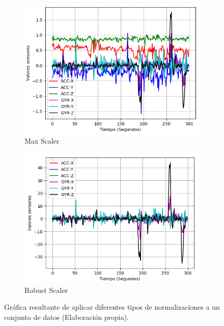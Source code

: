 \begin{figure}
{\begin{varwidth}{\textwidth}
        \begin{subfigure}[h]{0.45\textwidth} 
            \includegraphics[width=\textwidth]{imagenes/Cap3/datos_max_scaler}
            \caption{Max Scaler}
            \label{fig:max}
        \end{subfigure}       
        \begin{subfigure}[h]{0.45\textwidth} 
            \includegraphics[width=\textwidth]{imagenes/Cap3/datos_robust_scaler}
            \caption{Robust Scaler}
            \label{fig:robust}
        \end{subfigure}
        \end{varwidth}}
        \caption{Gr\'{a}fica resultante de aplicar diferentes tipos de normalizaciones a un conjunto de datos (Elaboraci\'{o}n propia).}
        
		\label{fig:nor_nor}
    \end{figure}


